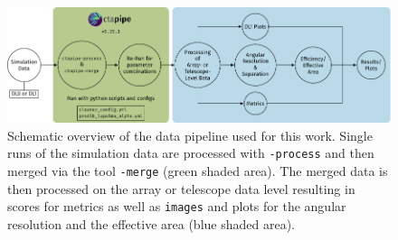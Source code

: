 \begin{figure}
    \centering
    \includegraphics[width=\textwidth]{graphics/data_pipeline.pdf}
    \caption{Schematic overview of the data pipeline used for this work. Single runs of the simulation
    data are processed with \ctapipe\texttt{-process} and then merged via the tool \ctapipe\texttt{-merge} (green shaded area).
    The merged data is then processed on the array or telescope data level resulting in scores for metrics
    as well as \dlo{} \texttt{images} and plots for the angular resolution and the effective area (blue shaded area).}
    \label{fig:data-processing}
\end{figure}



